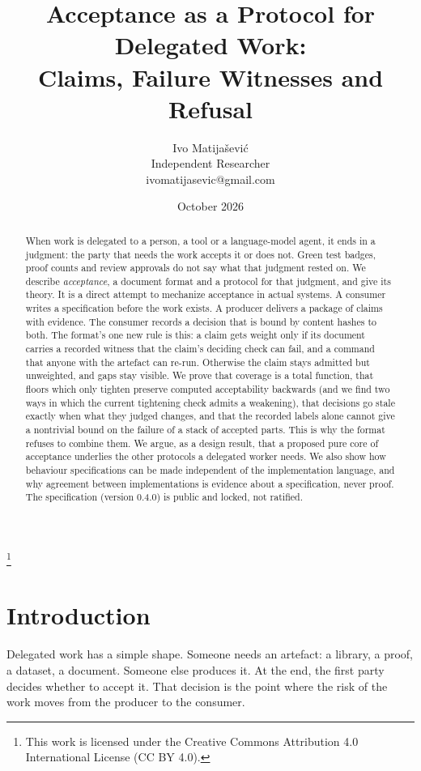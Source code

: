 \documentclass[11pt]{article}
\title{\vspace{-2em}Acceptance as a Protocol for Delegated Work:\\
\large Claims, Failure Witnesses and Refusal}
\author{Ivo Matija\v{s}evi\'c\\ \small Independent Researcher \\ \small ivomatijasevic@gmail.com}
\date{October 2026}
\theoremstyle{definition}
\theoremstyle{remark}
\newcommand\blfootnote[1]{\begingroup\renewcommand\thefootnote{}\footnote{#1}\addtocounter{footnote}{-1}\endgroup}
\begin{document}
\maketitle
\blfootnote{This work is licensed under the Creative Commons Attribution 4.0 International License (CC BY 4.0).}

\begin{abstract}
When work is delegated to a person, a tool or a language-model agent, it ends in a judgment: the
party that needs the work accepts it or does not. Green test badges, proof counts and review
approvals do not say what that judgment rested on. We describe \emph{acceptance}, a document
format and a protocol for that judgment, and give its theory. It is a direct attempt to mechanize
acceptance in actual systems. A consumer writes a specification before the work exists. A producer
delivers a package of claims with evidence. The consumer records a decision that is bound by content
hashes to both. The format's one new rule is this: a claim gets
weight only if its document carries a recorded witness that the claim's deciding check can fail,
and a command that anyone with the artefact can re-run. Otherwise the claim stays admitted but
unweighted, and gaps stay visible. We prove that coverage is a total function, that floors which
only tighten preserve computed acceptability backwards (and we find two ways in which the current
tightening check admits a weakening), that decisions go stale exactly when what they judged
changes, and that the recorded labels alone cannot give a nontrivial bound on the failure of a
stack of accepted parts. This is why the format refuses to combine them. We argue, as a design
result, that a proposed pure core of acceptance underlies the other protocols a delegated worker
needs. We also show how behaviour specifications can be
made independent of the implementation language, and why agreement between implementations is
evidence about a specification, never proof. The specification (version 0.4.0) is public and
locked, not ratified.
\end{abstract}

\section{Introduction}\label{sec:intro}

Delegated work has a simple shape. Someone needs an artefact: a library, a proof, a dataset, a
document. Someone else produces it. At the end, the first party decides whether to accept it. That
decision is the point where the risk of the work moves from the producer to the consumer.
\end{document}
